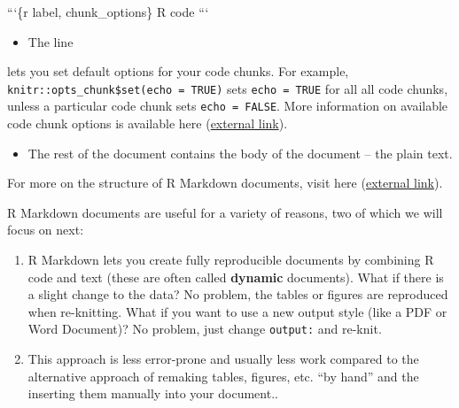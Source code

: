 \documentclass[
]{book}
\newenvironment{Shaded}{\begin{snugshade}}{\end{snugshade}}
\newcommand{\BaseNTok}[1]{\textcolor[rgb]{0.00,0.00,0.81}{#1}}
\newcommand{\NormalTok}[1]{#1}
\providecommand{\tightlist}{%
  \setlength{\itemsep}{0pt}\setlength{\parskip}{0pt}}
\begin{document}
\begin{Shaded}
\begin{Highlighting}[]
\BaseNTok{```\{r label, chunk_options\}}
\BaseNTok{R code}
\BaseNTok{```}
\end{Highlighting}
\end{Shaded}

\begin{itemize}
\tightlist
\item
  The line
\end{itemize}

\begin{Shaded}
\end{Shaded}

lets you set default options for your code chunks. For example, \texttt{knitr::opts\_chunk\$set(echo\ =\ TRUE)} sets \texttt{echo\ =\ TRUE} for all all code chunks, unless a particular code chunk sets \texttt{echo\ =\ FALSE}. More information on available code chunk options is available here (\href{https://yihui.org/knitr/options/}{external link}).

\begin{itemize}
\tightlist
\item
  The rest of the document contains the body of the document -- the plain text.
\end{itemize}

For more on the structure of R Markdown documents, visit here (\href{https://bookdown.org/yihui/rmarkdown-cookbook/conceptual-overview.html}{external link}).

R Markdown documents are useful for a variety of reasons, two of which we will focus on next:

\begin{enumerate}
\def\labelenumi{\arabic{enumi}.}
\tightlist
\item
  R Markdown lets you create fully reproducible documents by combining R code and text (these are often called \textbf{dynamic} documents). What if there is a slight change to the data? No problem, the tables or figures are reproduced when re-knitting. What if you want to use a new output style (like a PDF or Word Document)? No problem, just change \texttt{output:} and re-knit.
\item
  This approach is less error-prone and usually less work compared to the alternative approach of remaking tables, figures, etc. ``by hand'' and the inserting them manually into your document..
\end{enumerate}
\end{document}
